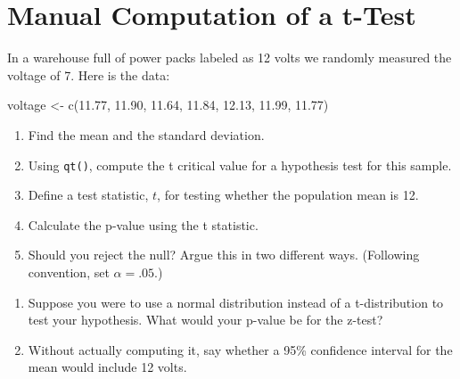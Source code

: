 \documentclass[
]{book}
\newenvironment{Shaded}{\begin{snugshade}}{\end{snugshade}}
\newcommand{\FloatTok}[1]{\textcolor[rgb]{0.00,0.00,0.81}{#1}}
\newcommand{\FunctionTok}[1]{\textcolor[rgb]{0.00,0.00,0.00}{#1}}
\newcommand{\NormalTok}[1]{#1}
\newcommand{\OtherTok}[1]{\textcolor[rgb]{0.56,0.35,0.01}{#1}}
\theoremstyle{definition}
\theoremstyle{definition}
\theoremstyle{definition}
\theoremstyle{definition}
\theoremstyle{remark}
\begin{document}
\hypertarget{manual-computation-of-a-t-test}{%
\section{Manual Computation of a t-Test}\label{manual-computation-of-a-t-test}}

In a warehouse full of power packs labeled as 12 volts we randomly measured the voltage of 7. Here is the data:

\begin{Shaded}
\begin{Highlighting}[]
\NormalTok{voltage }\OtherTok{\textless{}{-}} \FunctionTok{c}\NormalTok{(}\FloatTok{11.77}\NormalTok{, }\FloatTok{11.90}\NormalTok{, }\FloatTok{11.64}\NormalTok{, }\FloatTok{11.84}\NormalTok{, }\FloatTok{12.13}\NormalTok{, }\FloatTok{11.99}\NormalTok{,  }\FloatTok{11.77}\NormalTok{)}
\end{Highlighting}
\end{Shaded}

\begin{enumerate}
\def\labelenumi{\arabic{enumi}.}
\item
  Find the mean and the standard deviation.
\item
  Using \texttt{qt()}, compute the t critical value for a hypothesis test for this sample.
\item
  Define a test statistic, \(t\), for testing whether the population mean is 12.
\item
  Calculate the p-value using the t statistic.
\item
  Should you reject the null? Argue this in two different ways. (Following convention, set \(\alpha = .05\).)
\end{enumerate}

\begin{quote}
\end{quote}

\begin{enumerate}
\def\labelenumi{\arabic{enumi}.}
\setcounter{enumi}{5}
\item
  Suppose you were to use a normal distribution instead of a t-distribution to test your hypothesis. What would your p-value be for the z-test?
\item
  Without actually computing it, say whether a 95\% confidence interval for the mean would include 12 volts.
\end{enumerate}

\begin{quote}
\end{quote}
\end{document}
